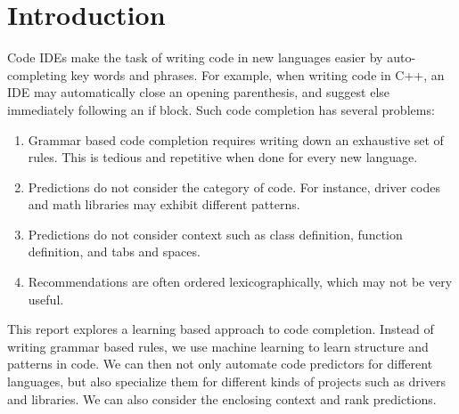 \section{Introduction}
\label{sec:intro}

\noindent
Code IDEs
make the task of writing
code in new languages easier by auto-completing key words and phrases.
For example, when writing code in C++, an IDE may automatically close an
opening parenthesis, and suggest else immediately following an if block.
Such code completion has several problems:
\begin{enumerate}[topsep=0pt,itemsep=-1ex,partopsep=1ex,parsep=1ex]
  \item Grammar based code completion requires writing down an exhaustive set
    of rules. This is tedious and repetitive when done for every new language.
  \item Predictions do not consider the category of code. For instance, driver
    codes and math libraries may exhibit different patterns.
  \item Predictions do not consider context such as class
    definition, function definition, and tabs and spaces.
  \item Recommendations are often ordered lexicographically, which may not be
  very useful.
\end{enumerate}

\noindent
This report explores a learning based approach to code completion. Instead of
writing grammar based rules, we use machine learning to learn structure and
patterns in code. We can then not only automate code predictors for different
languages, but also specialize them for different kinds of projects such as
drivers and libraries. We can also consider the enclosing context and rank
predictions.
